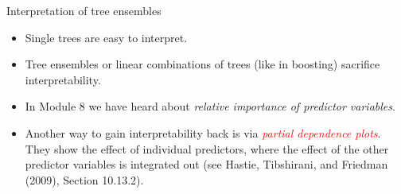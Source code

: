 \documentclass[
  10pt,
  ignorenonframetext,
]{beamer}
\providecommand{\tightlist}{%
  \setlength{\itemsep}{0pt}\setlength{\parskip}{0pt}}
\begin{document}
\begin{frame}{Interpretation of tree ensembles}
\protect\hypertarget{interpretation-of-tree-ensembles}{}
\(~\)

\begin{itemize}
\tightlist
\item
  Single trees are easy to interpret.
\end{itemize}

\vspace{2mm}

\begin{itemize}
\tightlist
\item
  Tree ensembles or linear combinations of trees (like in boosting)
  sacrifice interpretability.
\end{itemize}

\vspace{2mm}

\begin{itemize}
\tightlist
\item
  In Module 8 we have heard about \emph{relative importance of predictor
  variables}.
\end{itemize}

\vspace{2mm}

\begin{itemize}
\tightlist
\item
  Another way to gain interpretability back is via
  \emph{\textcolor{red}{partial dependence plots}}. They show the effect
  of individual predictors, where the effect of the other predictor
  variables is integrated out (see Hastie, Tibshirani, and Friedman
  (2009), Section 10.13.2).
\end{itemize}
\end{frame}
\end{document}
